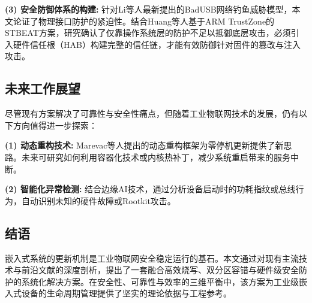 \documentclass[a4paper,12pt]{article}
\begin{document}
\textbf{(3) 安全防御体系的构建:} 
针对Li等人最新提出的BadUSB网络钓鱼威胁模型\cite{Li2025}，本文论证了物理接口防护的紧迫性。结合Huang等人基于ARM TrustZone的STBEAT方案\cite{Huang2022}，研究确认了仅靠操作系统层的防护不足以抵御底层攻击，必须引入硬件信任根（HAB）构建完整的信任链，才能有效防御针对固件的篡改与注入攻击。

\subsection{未来工作展望}
尽管现有方案解决了可靠性与安全性痛点，但随着工业物联网技术的发展，仍有以下方向值得进一步探索：

\textbf{(1) 动态重构技术:} Marevac等人提出的动态重构框架为零停机更新提供了新思路\cite{Marevac2025}。未来可研究如何利用容器化技术或内核热补丁，减少系统重启带来的服务中断。

\textbf{(2) 智能化异常检测:} 结合边缘AI技术，通过分析设备启动时的功耗指纹或总线行为，自动识别未知的硬件故障或Rootkit攻击。

\subsection{结语}
嵌入式系统的更新机制是工业物联网安全稳定运行的基石。本文通过对现有主流技术与前沿文献的深度剖析，提出了一套融合高效烧写、双分区容错与硬件级安全防护的系统化解决方案。在安全性、可靠性与效率的三维平衡中，该方案为工业级嵌入式设备的生命周期管理提供了坚实的理论依据与工程参考。
\newpage
\end{document}
